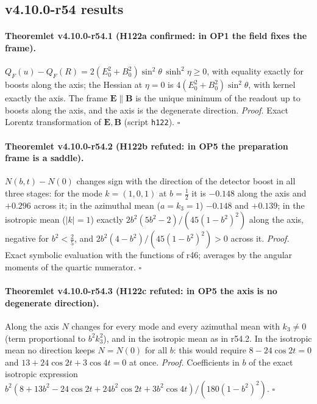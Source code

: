 \subsection*{v4.10.0-r54 results}
\label{subsec:v4100-r54-results}

\paragraph{Theoremlet v4.10.0-r54.1 (H122a confirmed: in OP1 the field fixes the frame).}
\(Q_F(u)-Q_F(R)=2(E_0^2+B_0^2)\sin^2\theta\,\sinh^2\eta\ge0\), with equality exactly for boosts along the axis; the Hessian at \(\eta=0\) is \(4(E_0^2+B_0^2)\sin^2\theta\), with kernel exactly
the axis.  The frame \(\mathbf E\parallel\mathbf B\) is the unique minimum of the readout up to boosts along the axis, and the axis is the degenerate direction.
\emph{Proof.} Exact Lorentz transformation of \(\mathbf E,\mathbf B\) (script \texttt{h122}).  \(\square\)

\paragraph{Theoremlet v4.10.0-r54.2 (H122b refuted: in OP5 the preparation frame is a saddle).}
\(N(b,t)-N(0)\) changes sign with the direction of the detector boost in all three stages: for the mode \(k=(1,0,1)\) at \(b=\tfrac12\) it is \(-0.148\) along the
axis and \(+0.296\) across it; in the azimuthal mean (\(a=k_3=1\)) \(-0.148\) and \(+0.139\); in the isotropic mean (\(|k|=1\)) exactly
\(2b^2(5b^2-2)/(45(1-b^2)^2)\) along the axis, negative for \(b^2<\tfrac25\), and \(2b^2(4-b^2)/(45(1-b^2)^2)>0\) across it.
\emph{Proof.} Exact symbolic evaluation with the functions of r46; averages by the angular moments of the quartic numerator.  \(\square\)

\paragraph{Theoremlet v4.10.0-r54.3 (H122c refuted: in OP5 the axis is no degenerate direction).}
Along the axis \(N\) changes for every mode and every azimuthal mean with \(k_3\ne0\) (term proportional to \(b^2k_3^2\)), and in the isotropic mean as in r54.2.
In the isotropic mean no direction keeps \(N=N(0)\) for all \(b\): this would require \(8-24\cos2t=0\) and \(13+24\cos2t+3\cos4t=0\) at once.
\emph{Proof.} Coefficients in \(b\) of the exact isotropic expression \(b^2(8+13b^2-24\cos2t+24b^2\cos2t+3b^2\cos4t)/(180(1-b^2)^2)\).  \(\square\)

